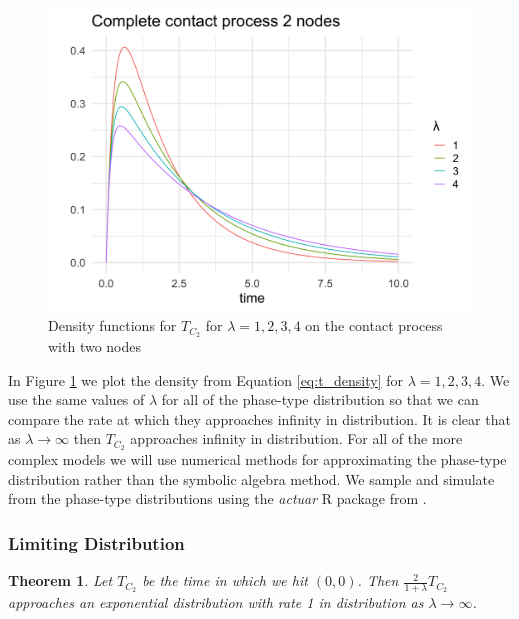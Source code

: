 \documentclass{article}
\theoremstyle{plain}
\newtheorem{theorem}{Theorem}[section]
\theoremstyle{definition}
\theoremstyle{remark}
\numberwithin{equation}{section}
\begin{document}
\begin{figure}[h]
  \centering
    \includegraphics[width=.80\textwidth]{figures/complete_2_contact_phase_densities.png}
   \caption{Density functions for $T_{C_2}$ for $\lambda = 1, 2, 3, 4$ on the contact process with two nodes}
  \label{fig:contact_2_phase_densities}
\end{figure}

In Figure \ref{fig:contact_2_phase_densities} we plot the density from Equation \ref{eq:t_density} for $\lambda = 1, 2, 3, 4$.
We use the same values of $\lambda$ for all of the phase-type distribution so that we can compare the rate at which they approaches infinity in distribution.
It is clear that as $\lambda \to \infty$ then $T_{C_2}$ approaches infinity in distribution.
For all of the more complex models we will use numerical methods for approximating the phase-type distribution rather than the symbolic algebra method.
We sample and simulate from the phase-type distributions using the \textit{actuar} R package from \cite{actuar2008}.

\subsubsection{Limiting Distribution}

\begin{theorem}
Let $T_{C_2}$ be the time in which we hit $(0,0)$.
Then $\frac{2}{1 + \lambda} T_{C_2}$ approaches an exponential distribution with rate 1 in distribution as $\lambda \to \infty$.
\end{theorem}
\end{document}
